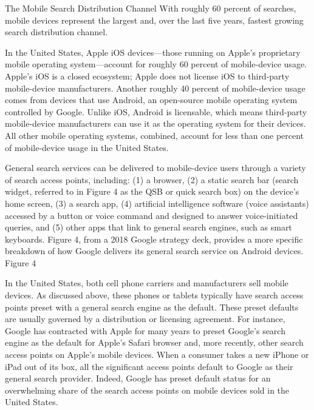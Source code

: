 \documentclass[11pt,b5paper]{scrartcl}
\begin{document}



The Mobile Search Distribution Channel
With roughly 60 percent of searches, mobile devices represent the largest and,
over the last five years, fastest growing search distribution channel.


In the United States, Apple iOS devices—those running on Apple’s proprietary
mobile operating system—account for roughly 60 percent of mobile-device usage. Apple’s iOS
is a closed ecosystem; Apple does not license iOS to third-party mobile-device manufacturers.
Another roughly 40 percent of mobile-device usage comes from devices that use Android, an
open-source mobile operating system controlled by Google. Unlike iOS, Android is licensable,
which means third-party mobile-device manufacturers can use it as the operating system for their
devices. All other mobile operating systems, combined, account for less than one percent of
mobile-device usage in the United States.


General search services can be delivered to mobile-device users through a variety
of search access points, including: (1) a browser, (2) a static search bar (search widget, referred
to in Figure 4 as the QSB or quick search box) on the device’s home screen, (3) a search app,
(4) artificial intelligence software (voice assistants) accessed by a button or voice command and
designed to answer voice-initiated queries, and (5) other apps that link to general search engines,
such as smart keyboards. Figure 4, from a 2018 Google strategy deck, provides a more specific
breakdown of how Google delivers its general search service on Android devices.
Figure 4


In the United States, both cell phone carriers and manufacturers sell mobile
devices. As discussed above, these phones or tablets typically have search access points preset
with a general search engine as the default. These preset defaults are usually governed by a
distribution or licensing agreement. For instance, Google has contracted with Apple for many
years to preset Google’s search engine as the default for Apple’s Safari browser and, more
recently, other search access points on Apple’s mobile devices. When a consumer takes a new
iPhone or iPad out of its box, all the significant access points default to Google as their general
search provider. Indeed, Google has preset default status for an overwhelming share of the search
access points on mobile devices sold in the United States.
\end{document}
